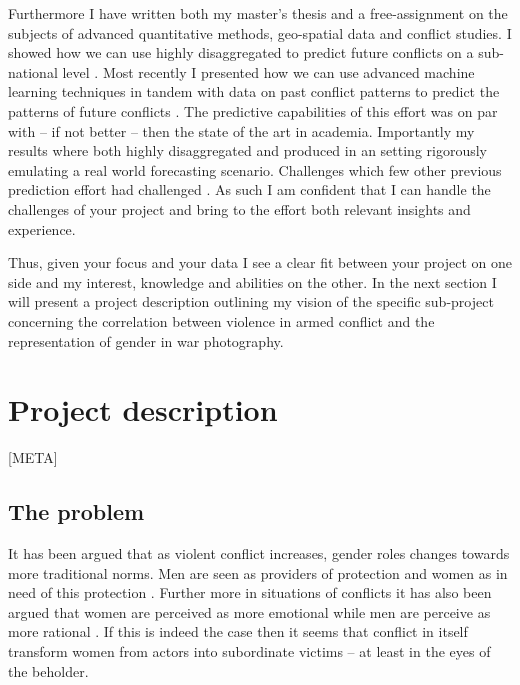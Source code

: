 \documentclass[a4paper]{article}
\begin{document}
Furthermore I have written both my master's thesis \citep{SPECIALE} and a free-assignment \citep{Maase}  on the subjects of advanced quantitative methods, geo-spatial data and conflict studies. I showed how we can use highly disaggregated to predict future conflicts on a sub-national level \cite{Maase,SPECIALE}. Most recently I presented how we can use advanced machine learning techniques in tandem with data on past conflict patterns to predict the patterns of future conflicts \cite{SPECIALE}. The predictive capabilities of this effort was on par with -- if not better -- then the state of the art in academia. Importantly my results where both highly disaggregated and produced in an setting rigorously emulating a real world forecasting scenario. Challenges which few other previous prediction effort had challenged \citep[48-50]{SPECIALE}. As such I am confident that I can handle the challenges of your project and bring to the effort both relevant insights and experience.\par

Thus, given your focus and your data I see a clear fit between your project on one side and my interest, knowledge and abilities on the other. In the next section I will present a project description outlining my vision of the specific sub-project concerning the correlation between violence in armed conflict and the representation of gender in war photography.\par

\section{Project description} 

[META]

\subsection{The problem}


It has been argued that as violent conflict increases, gender roles changes towards more traditional norms. Men are seen as providers of protection and women as in need of this protection \cite{elshtain1995women, carpenter2003women}. Further more in situations of conflicts it has also been argued that women are perceived as more emotional while men are perceive as more rational \cite{elshtain1993public}. If this is indeed the case then it seems that conflict in itself transform women from actors into subordinate victims -- at least in the eyes of the beholder.\par 
\end{document}
